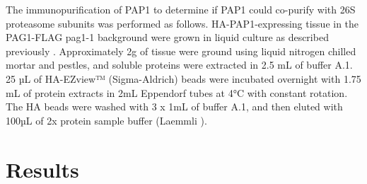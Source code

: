 	The immunopurification of PAP1 to determine if PAP1 could co-purify with 26S proteasome subunits was performed as follows. HA-PAP1-expressing tissue in the PAG1-FLAG pag1-1 background were grown in liquid culture as described previously \citep{book10}. Approximately 2g of tissue were ground using liquid nitrogen chilled mortar and pestles, and soluble proteins were extracted in 2.5 mL of buffer A.1. 25 µL of HA-EZview™ (Sigma-Aldrich) beads were incubated overnight with 1.75 mL of protein extracts in 2mL Eppendorf tubes at 4°C with constant rotation. The HA beads were washed with 3 x 1mL of buffer A.1, and then eluted with 100µL of 2x protein sample buffer (Laemmli \citep{laemmli70}). 
	 
\section{Results}

